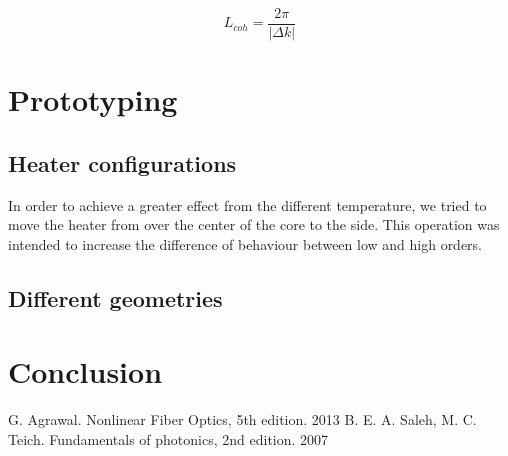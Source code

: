 \documentclass[12pt,a4paper,twoside]{article}
\begin{document}
$$L_{coh} = \frac{2\pi}{|\Delta k|}$$



\section{Prototyping}

\subsection{Heater configurations}
In order to achieve a greater effect from the different temperature, we tried to move the heater from over the center of the core to the side.
This operation was intended to increase the difference of behaviour between low and high orders.
\subsection{Different geometries}

\section{Conclusion}

\cleardoublepage
\begin{thebibliography}{9}
 G. Agrawal. Nonlinear Fiber Optics, 5th edition. 2013
 B. E. A. Saleh, M. C. Teich. Fundamentals of photonics, 2nd edition. 2007
\end{thebibliography}
\end{document}
